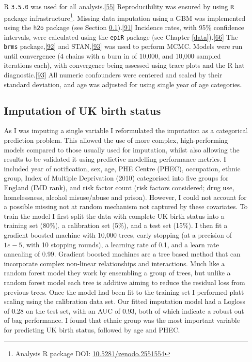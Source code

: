 \documentclass[11pt,twoside]{bristolthesis}
\begin{document}
  R \texttt{3.5.0} was used for all analysis.{[}\protect\hyperlink{ref-R}{55}{]} Reproducibility was ensured by using \texttt{R} package infrastructure\footnote{Analysis R package DOI: \href{https://zenodo.org/badge/latestdoi/93072437}{10.5281/zenodo.2551554}}. Missing data imputation using a GBM was implemented using the \texttt{h2o} package (see Section \ref{imp-uk-birth-status}).{[}\protect\hyperlink{ref-h2o2018}{91}{]} Incidence rates, with 95\% confidence intervals, were calculated using the \texttt{epiR} package (see Chapter \ref{data}).{[}\protect\hyperlink{ref-EpiR}{66}{]} The \texttt{brms} package,{[}\protect\hyperlink{ref-Burkner}{92}{]} and STAN,{[}\protect\hyperlink{ref-StanDevelopmentTeam2016}{93}{]} was used to perform MCMC. Models were run until convergence (4 chains with a burn in of 10,000, and 10,000 sampled iterations each), with convergence being assessed using trace plots and the R hat diagnostic.{[}\protect\hyperlink{ref-StanDevelopmentTeam2016}{93}{]} All numeric confounders were centered and scaled by their standard deviation, and age was adjusted for using single year of age categories.
  
  \hypertarget{imp-uk-birth-status}{%
  \subsection{Imputation of UK birth status}\label{imp-uk-birth-status}}
  
  As I was imputing a single variable I reformulated the imputation as a categorical prediction problem. This allowed the use of more complex, high-performing models compared to those usually used for imputation, whilst also allowing the results to be validated it using predictive modelling performance metrics. I included year of notification, sex, age, PHE Centre (PHEC), occupation, ethnic group, Index of Multiple Deprivation (2010) categorised into five groups for England (IMD rank), and risk factor count (risk factors considered; drug use, homelessness, alcohol misuse/abuse and prison). However, I could not account for a possible missing not at random mechanism not captured by these covariates. To train the model I first split the data with complete UK birth status into a training set (80\%), a calibration set (5\%), and a test set (15\%). I then fit a gradient boosted machine with 10,000 trees, early stopping (at a precision of \(1e-5\), with 10 stopping rounds), a learning rate of 0.1, and a learn rate annealing of 0.99. Gradient boosted machines are a tree based method that can incorporate complex non-linear relationships and interactions. Much like a random forest model they work by ensembling a group of trees, but unlike a random forest model each tree is additive aiming to reduce the residual loss from previous trees. Once the model had been fit to the training set I performed platt scaling using the calibration data set. Our fitted imputation model had a Logloss of 0.28 on the test set, with an AUC of 0.93, both of which indicate a robust out of bag performance. I found that ethnic group was the most important variable for predicting UK birth status, followed by age and PHEC.
  
\end{document}
